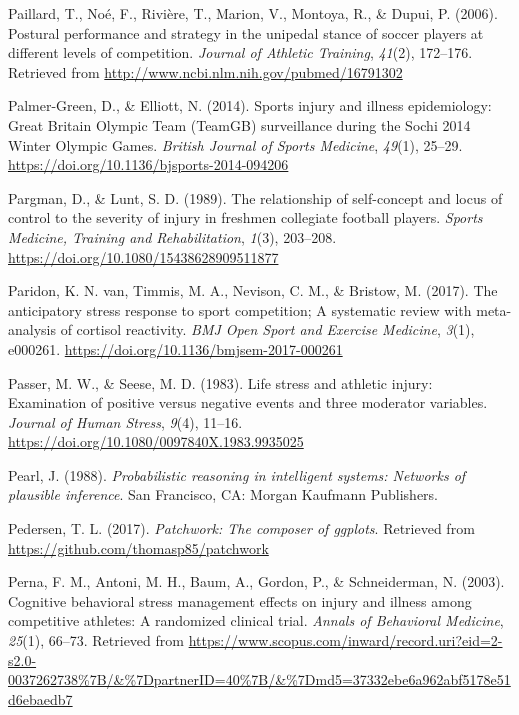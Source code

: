 \documentclass[
  english,
  man,floatsintext]{apa6}
\begin{document}
\leavevmode\hypertarget{ref-Paillard2006}{}%
Paillard, T., Noé, F., Rivière, T., Marion, V., Montoya, R., \& Dupui, P. (2006). Postural performance and strategy in the unipedal stance of soccer players at different levels of competition. \emph{Journal of Athletic Training}, \emph{41}(2), 172--176. Retrieved from \url{http://www.ncbi.nlm.nih.gov/pubmed/16791302}

\leavevmode\hypertarget{ref-Palmer-Green2014}{}%
Palmer-Green, D., \& Elliott, N. (2014). Sports injury and illness epidemiology: Great Britain Olympic Team (TeamGB) surveillance during the Sochi 2014 Winter Olympic Games. \emph{British Journal of Sports Medicine}, \emph{49}(1), 25--29. \url{https://doi.org/10.1136/bjsports-2014-094206}

\leavevmode\hypertarget{ref-Pargman1989}{}%
Pargman, D., \& Lunt, S. D. (1989). The relationship of self-concept and locus of control to the severity of injury in freshmen collegiate football players. \emph{Sports Medicine, Training and Rehabilitation}, \emph{1}(3), 203--208. \url{https://doi.org/10.1080/15438628909511877}

\leavevmode\hypertarget{ref-VanParidon2017}{}%
Paridon, K. N. van, Timmis, M. A., Nevison, C. M., \& Bristow, M. (2017). The anticipatory stress response to sport competition; A systematic review with meta-analysis of cortisol reactivity. \emph{BMJ Open Sport and Exercise Medicine}, \emph{3}(1), e000261. \url{https://doi.org/10.1136/bmjsem-2017-000261}

\leavevmode\hypertarget{ref-Passer1983a}{}%
Passer, M. W., \& Seese, M. D. (1983). Life stress and athletic injury: Examination of positive versus negative events and three moderator variables. \emph{Journal of Human Stress}, \emph{9}(4), 11--16. \url{https://doi.org/10.1080/0097840X.1983.9935025}

\leavevmode\hypertarget{ref-Pearl1988}{}%
Pearl, J. (1988). \emph{Probabilistic reasoning in intelligent systems: Networks of plausible inference}. San Francisco, CA: Morgan Kaufmann Publishers.

\leavevmode\hypertarget{ref-R-patchwork}{}%
Pedersen, T. L. (2017). \emph{Patchwork: The composer of ggplots}. Retrieved from \url{https://github.com/thomasp85/patchwork}

\leavevmode\hypertarget{ref-Perna2003}{}%
Perna, F. M., Antoni, M. H., Baum, A., Gordon, P., \& Schneiderman, N. (2003). Cognitive behavioral stress management effects on injury and illness among competitive athletes: A randomized clinical trial. \emph{Annals of Behavioral Medicine}, \emph{25}(1), 66--73. Retrieved from \url{https://www.scopus.com/inward/record.uri?eid=2-s2.0-0037262738\%7B/\&\%7DpartnerID=40\%7B/\&\%7Dmd5=37332ebe6a962abf5178e51d6ebaedb7}
\end{document}
